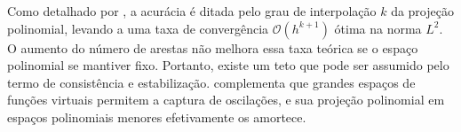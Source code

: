     \indent Como detalhado por \citet{basicprinciplesvirtualelementmethods2013a}, a acurácia é ditada pelo grau de interpolação $k$ da projeção polinomial, levando a uma taxa de convergência $\mathcal{O}(h^{k+1})$ ótima na norma $L^2$. O aumento do número de arestas não melhora essa taxa teórica se o espaço polinomial se mantiver fixo. Portanto, existe um teto que pode ser assumido pelo termo de consistência e estabilização. \citet{virtualelementmethodwheelrailcontactproblems2021} complementa que grandes espaços de funções virtuais permitem a captura de oscilações, e sua projeção polinomial em espaços polinomiais menores efetivamente os amortece.